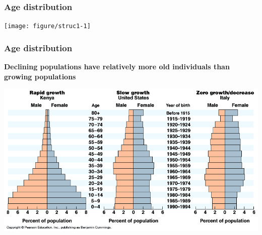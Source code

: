 \documentclass[color=usenames,dvipsnames]{beamer}\usepackage[]{graphicx}\usepackage[]{color}
\newenvironment{knitrout}{}{} %
\begin{document}
\begin{frame}[fragile]
  \frametitle{Age distribution}
\begin{knitrout}
\color{fgcolor}

{\centering \texttt{[image: figure/struc1-1]} 

}


\end{knitrout}
\end{frame}




\begin{frame}
  \frametitle{Age distribution}
  {\centering \bf Declining populations have relatively more old individuals than
  growing populations \\}
  \begin{center}
    \includegraphics[width=\textwidth]{figs/AgeStructures}
  \end{center}
\end{frame}
\end{document}
